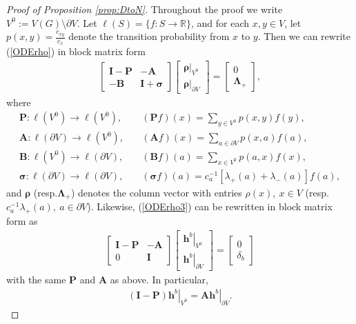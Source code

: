 \documentclass[11pt]{amsart}
\theoremstyle{plain}
\theoremstyle{definition}
\theoremstyle{remark}
\begin{document}
\begin{proof}[Proof of Proposition \ref{prop:DtoN}]
Throughout the proof we write $V^0 := V(G) \setminus \partial V$. Let $\ell(S) =\{f: S\to\mathbb{R}\}$, and for each $x,y \in V$, let $p(x,y)=\frac{c_{xy}}{c_x}$ denote the transition probability from $x$ to $y$. Then we can rewrite (\ref{ODErho}) in block matrix form
\begin{align}
\label{hblock}
\begin{bmatrix}\boldsymbol{I-P} & -\boldsymbol{A} \\ -\boldsymbol{B}  & \boldsymbol{I+\sigma} \end{bmatrix}
\begin{bmatrix} \left.\boldsymbol{\rho}\right|_{V^0} \\ \left.\boldsymbol{\rho}\right|_{\partial V} \end{bmatrix} = 
\begin{bmatrix} 0 \\ \boldsymbol{\Lambda}_+ \end{bmatrix},
\end{align}
where 
\begin{align*}
\boldsymbol P : \ell(V^0) \to \ell(V^0),& \quad  ({\boldsymbol P}f)(x) = \sum_{y\in V^0} p(x,y) f(y),\\
\boldsymbol A : \ell(\partial V) \to \ell(V^0),& \quad ({\boldsymbol A}f)(x) = \sum_{a\in \partial V} p(x,a) f(a),\\
\boldsymbol B : \ell(V^0) \to \ell(\partial V),& \quad ({\boldsymbol B}f)(a) = \sum_{x \in V^0} p(a,x) f(x) ,\\ 
\boldsymbol \sigma : \ell(\partial V) \to \ell(\partial V), & \quad  ({\boldsymbol \sigma}f)(a) = c_a^{-1} [\lambda_+(a) + \lambda_-(a)]f(a),
\end{align*}
and $\boldsymbol \rho$ (resp.\@ ${\boldsymbol \Lambda}_+$) denotes the column vector with entries $\rho(x),~x\in V$ (resp. $c_a^{-1} \lambda_+(a),~a\in \partial V$).
Likewise, (\ref{ODErho3}) can be rewritten in block matrix form as
\begin{align}
\label{hblock2}
\begin{bmatrix} \boldsymbol{I-P} & -\boldsymbol{A} \\ 0 & \boldsymbol{I} \end{bmatrix} \begin{bmatrix} \left.\boldsymbol{h}^b \right|_{V^0} \\ \left.\boldsymbol{h}^b \right|_{\partial V}\end{bmatrix} = \begin{bmatrix} 0 \\ \delta_b\end{bmatrix}
\end{align}
with the same $\boldsymbol P$ and $\boldsymbol A$ as above. In particular,
\begin{align}
\label{eq:I-P}
(\boldsymbol I - \boldsymbol P) \left.\boldsymbol h^b\right|_{V^0} = \boldsymbol A \left.\boldsymbol h^b\right|_{\partial V}.
\end{align}


\end{proof}
\end{document}
